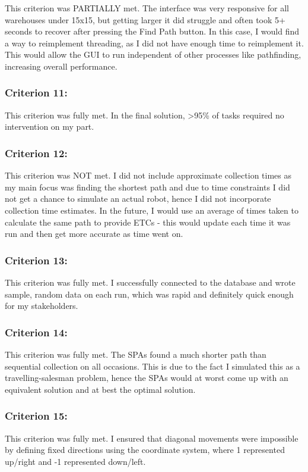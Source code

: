 This criterion was PARTIALLY met. The interface was very responsive for all warehouses under 15x15, but getting larger it did struggle and often took 5+ seconds to recover after pressing the Find Path button. In this case, I would find a way to reimplement threading, as I did not have enough time to reimplement it. This would allow the GUI to run independent of other processes like pathfinding, increasing overall performance.

\subsubsection{Criterion 11:}

This criterion was fully met. In the final solution, >95\% of tasks required no intervention on my part.

\subsubsection{Criterion 12:}

This criterion was NOT met. I did not include approximate collection times as my main focus was finding the shortest path and due to time constraints I did not get a chance to simulate an actual robot, hence I did not incorporate collection time estimates. In the future, I would use an average of times taken to calculate the same path to provide ETCs - this would update each time it was run and then get more accurate as time went on.

\subsubsection{Criterion 13:}

This criterion was fully met. I successfully connected to the database and wrote sample, random data on each run, which was rapid and definitely quick enough for my stakeholders.

\subsubsection{Criterion 14:}

This criterion was fully met. The SPAs found a much shorter path than sequential collection on all occasions. This is due to the fact I simulated this as a travelling-salesman problem, hence the SPAs would at worst come up with an equivalent solution and at best the optimal solution.


\subsubsection{Criterion 15:}
This criterion was fully met. I ensured that diagonal movements were impossible by defining fixed directions using the coordinate system, where 1 represented up/right and -1 represented down/left.

